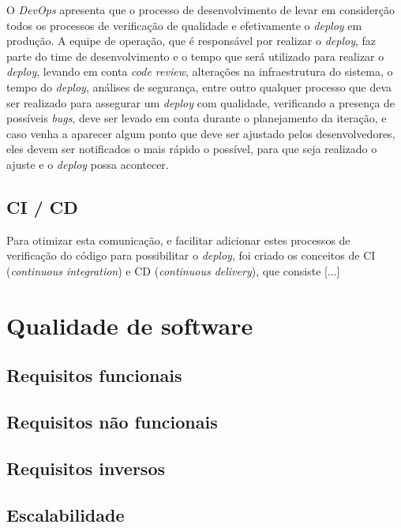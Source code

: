       O \textit{DevOps} apresenta que o processo de desenvolvimento de levar em
      considerção todos os processos de verificação de qualidade e efetivamente
      o \textit{deploy} em produção. A equipe de operação, que é responsável por
      realizar o \textit{deploy}, faz parte do time de desenvolvimento e o tempo
      que será utilizado para realizar o \textit{deploy}, levando em conta
      \textit{code review}, alterações na infraestrutura do sistema, o tempo do
      \textit{deploy}, análises de segurança, entre outro qualquer processo que
      deva ser realizado para assegurar um \textit{deploy} com qualidade, verificando
      a presença de possíveis \textit{bugs}, deve ser levado em conta durante o
      planejamento da iteração, e caso venha a aparecer algum ponto que deve ser
      ajustado pelos desenvolvedores, eles devem ser notificados o mais rápido o
      possível, para que seja realizado o ajuste e o \textit{deploy} possa acontecer.

    \section{CI / CD}
      Para otimizar esta comunicação, e facilitar adicionar estes processos de
      verificação do código para possibilitar o \textit{deploy}, foi criado os
      conceitos de CI (\textit{continuous integration}) e CD
      (\textit{continuous delivery}), que consiste [...]

  \chapter{Qualidade de software}

    \section{Requisitos funcionais}

    \section{Requisitos não funcionais}

    \section{Requisitos inversos}

    \section{Escalabilidade}

